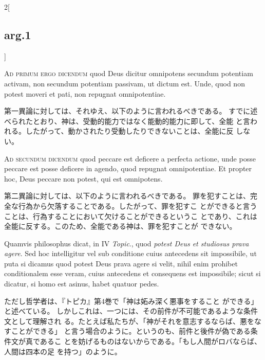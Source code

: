 \documentclass[paper=a4paper,fontsize=10pt,jafontsize=9pt,titlepage]{jlreq}
\begin{document}
\begin{paracol}{2}[\subsection{arg.1}]
\switchcolumn*[\subsection{ad.1}]

{\scshape Ad primum ergo dicendum} quod Deus dicitur
omnipotens secundum potentiam activam, non secundum potentiam passivam,
ut dictum est. Unde, quod non potest moveri et pati, non repugnat
omnipotentiae.

\switchcolumn

第一異論に対しては、それゆえ、以下のように言われるべきである。
すでに述べられたとおり、神は、受動的能力ではなく能動的能力に即して、全能
 と言われる。したがって、動かされたり受動したりできないことは、全能に反
 しない。

\switchcolumn*[\subsection{ad.2}]

{\scshape Ad secundum dicendum} quod peccare est
deficere a perfecta actione, unde posse peccare est posse deficere in
agendo, quod repugnat omnipotentiae. Et propter hoc, Deus peccare non
potest, qui est omnipotens.

\switchcolumn

第二異論に対しては、以下のように言われるべきである。
罪を犯すことは、完全な行為から欠落することである。したがって、罪を犯すこ
 とができると言うことは、行為することにおいて欠けることができるというこ
 とであり、これは全能に反する。このため、全能である神は、罪を犯すことが
 できない。

\switchcolumn*

Quamvis philosophus dicat, in IV {\itshape Topic}.,
quod {\itshape potest Deus et studiosus prava agere}. 
Sed hoc intelligitur vel sub
conditione cuius antecedens sit impossibile, ut puta si dicamus quod
potest Deus prava agere si velit, nihil enim prohibet conditionalem esse
veram, cuius antecedens et consequens est impossibile; sicut si dicatur,
si homo est asinus, habet quatuor pedes.

\switchcolumn

ただし哲学者は、『トピカ』第4巻で「神は妬み深く悪事をすること
 ができる」と述べている。
しかしこれは、一つには、その前件が不可能であるような条件文として理解され
 る。たとえば私たちが、「神がそれを意志するならば、悪をなすことができる」
 と言う場合のように。というのも、前件と後件が偽である条件文が真であるこ
 とを妨げるものはないからである。「もし人間がロバならば、人間は四本の足
 を持つ」のように。


\end{paracol}
\end{document}

